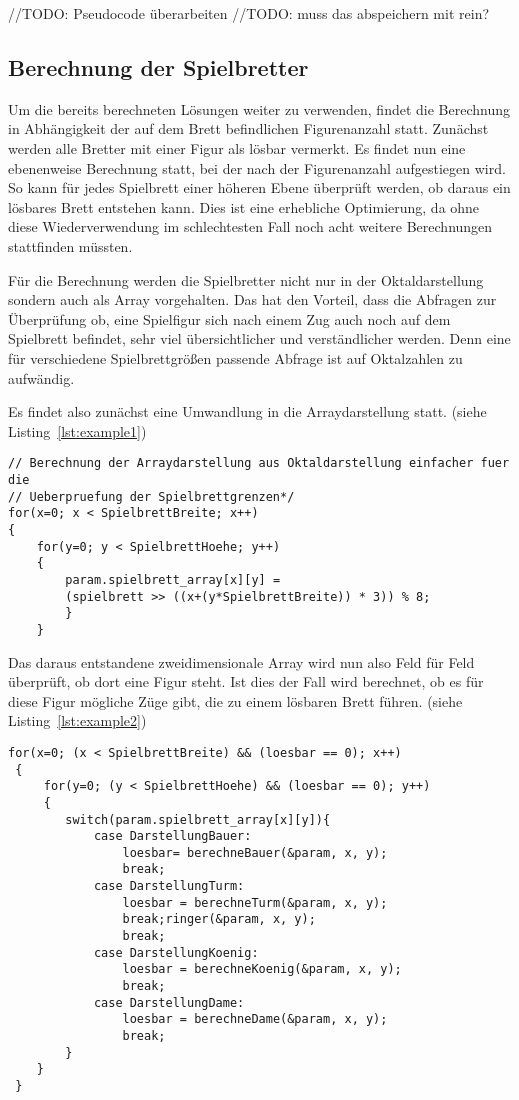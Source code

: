 \documentclass[
	12pt,
	a4paper,
	BCOR10mm,
	DIV14,
	listof=totoc,
	bibliography=totoc,
	headsepline
]{scrreprt}
\begin{document}
//TODO: Pseudocode überarbeiten
//TODO: muss das abspeichern mit rein?
      


\subsection{Berechnung der Spielbretter}
Um die bereits berechneten Lösungen weiter zu verwenden, findet die Berechnung in Abhängigkeit der auf dem Brett befindlichen Figurenanzahl statt.
Zunächst werden alle Bretter mit einer Figur als lösbar vermerkt.
Es findet nun eine ebenenweise Berechnung statt, bei der nach der Figurenanzahl aufgestiegen wird. So kann für jedes Spielbrett einer höheren Ebene überprüft werden, ob daraus ein lösbares Brett entstehen kann. Dies ist eine erhebliche Optimierung, da ohne diese Wiederverwendung im schlechtesten Fall noch acht weitere Berechnungen stattfinden müssten. 

Für die Berechnung werden die Spielbretter nicht nur in der Oktaldarstellung sondern auch als Array vorgehalten. 
Das hat den Vorteil, dass die Abfragen zur Überprüfung ob, eine Spielfigur sich nach einem Zug auch noch auf dem Spielbrett befindet, sehr viel übersichtlicher und verständlicher werden. 
Denn eine für verschiedene Spielbrettgrößen passende Abfrage ist auf Oktalzahlen zu aufwändig.

Es findet also zunächst eine Umwandlung in die Arraydarstellung statt.
(siehe Listing~\ref{lst:example1})
\begin{lstlisting}[caption={Umwandlung in Arraydarstellung}, label={lst:example1}]  
// Berechnung der Arraydarstellung aus Oktaldarstellung einfacher fuer die 
// Ueberpruefung der Spielbrettgrenzen*/
for(x=0; x < SpielbrettBreite; x++)
{
    for(y=0; y < SpielbrettHoehe; y++)
    {   
		param.spielbrett_array[x][y] = 
		(spielbrett >> ((x+(y*SpielbrettBreite)) * 3)) % 8;
        }
    }
\end{lstlisting}


Das daraus entstandene zweidimensionale Array wird nun also Feld für Feld überprüft, ob dort eine Figur steht. Ist dies der Fall wird berechnet, ob es für diese Figur mögliche Züge gibt, die zu einem lösbaren Brett führen.
(siehe Listing~\ref{lst:example2})
\begin{lstlisting}[caption={Berechnung eines Spielbrettes}, label={lst:example2}]
 for(x=0; (x < SpielbrettBreite) && (loesbar == 0); x++)
 {
     for(y=0; (y < SpielbrettHoehe) && (loesbar == 0); y++)
	 {   
		switch(param.spielbrett_array[x][y]){
			case DarstellungBauer:
				loesbar= berechneBauer(&param, x, y);
				break;
			case DarstellungTurm:
				loesbar = berechneTurm(&param, x, y);
				break;ringer(&param, x, y);
				break;
			case DarstellungKoenig:
				loesbar = berechneKoenig(&param, x, y);
				break;
			case DarstellungDame:
				loesbar = berechneDame(&param, x, y);
				break;
		}
	}
 }
\end{lstlisting}
\end{document}
